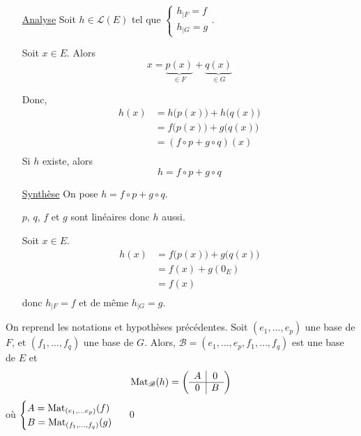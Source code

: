 \begin{prv}
	\begin{itemize}
		\item[\sc \underline{Analyse}] Soit $h \in \mathcal{L}(E)$ tel que $\begin{cases}
				h_{|F}=f\\
				h_{|G}=g
			\end{cases}$.

			Soit $x \in E$. Alors \[
				x = \underbrace{p(x)}_{\in F} + \underbrace{q(x)}_{\in G}
			\]

			Donc,
			\begin{align*}
				h(x) &= h\big(p(x)\big) + h\big(q(x)\big)\\
				&= f\big(p(x)\big) + g\big(q(x)\big) \\
				&= (f \circ p + g \circ q)(x) \\
			\end{align*}
			Si $h$ existe, alors \[
				h = f \circ p + g \circ q
			\]
		\item[\underline{\sc Synthèse}] On pose $h = f \circ p + g  \circ q$.

			$p$, $q$, $f$ et $g$ sont linéaires donc $h$ aussi.

			Soit $x \in E$.
			\begin{align*}
				h(x) &= f\big(p(x)\big) + g\big(q(x)\big) \\
				&= f(x) + g(0_E) \\
				&= f(x) \\
			\end{align*}
			donc $h_{|F} = f$ et de même $h_{|G}=g$.
	\end{itemize}
\end{prv}

\begin{prop}
	On reprend les notations et hypothèses précédentes. Soit $(e_1, \ldots, e_p)$ une base de $F$, et $(f_1, \ldots, f_q)$ une base de $G$. Alors, $\mathcal{B} = (e_1, \ldots, e_p, f_1, \ldots, f_q)$ est une base de $E$ et \[
		\operatorname{Mat}_\mathcal{B}(h) = \left(
		\begin{array}{c|c}
			A&0\\ \hline
			0&B
		\end{array}\right)
	\] où $\begin{cases}
		A = \operatorname{Mat}_{(e_1, \ldots e_p)}(f)\\
		B = \operatorname{Mat}_{(f_1, \ldots, f_q)}(g)
	\end{cases}$
	\qed
\end{prop}

